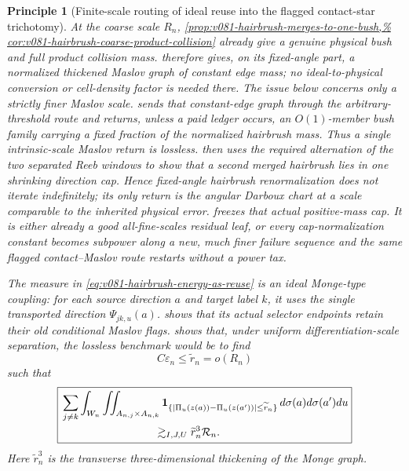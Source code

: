 \documentclass[10pt]{article}
\newtheorem{principle}[theorem]{Principle}
\begin{document}
\begin{principle}[Finite-scale routing of ideal reuse into the flagged contact-star trichotomy]
\label{pr:v081-hairbrush-reuse-routing}
At the coarse scale \(R_n\),
\cref{prop:v081-hairbrush-merges-to-one-bush,%
cor:v081-hairbrush-coarse-product-collision} already give a genuine physical bush and full product
collision mass.   therefore gives, on its
fixed-angle part, a normalized thickened Maslov graph of constant edge mass; no
ideal-to-physical conversion or cell-density factor is needed there.  The issue below concerns only
a strictly finer Maslov scale.
 sends that constant-edge graph
through the arbitrary-threshold route and returns, unless a paid ledger occurs, an \(O(1)\)-member
bush family carrying a fixed fraction of the normalized hairbrush mass.  Thus a single
intrinsic-scale Maslov return is lossless.   then uses the required alternation of the two
separated Reeb windows to show that a second merged hairbrush lies in one shrinking direction cap.
Hence fixed-angle hairbrush renormalization does not iterate indefinitely; its only return is the
angular Darboux chart at a scale comparable to the inherited physical error.
 freezes that actual positive-mass
cap.  It is either already a good all-fine-scales residual leaf, or every cap-normalization
constant becomes subpower along a new, much finer failure sequence and the same flagged
contact--Maslov route restarts without a power tax.

The measure in \eqref{eq:v081-hairbrush-energy-as-reuse} is an ideal Monge-type coupling: for each
source direction \(a\) and target label \(k\), it uses the single transported direction
\(\Psi_{jk,u}(a)\).   shows that its actual
selector endpoints retain their old conditional Maslov flags.   shows that, under uniform differentiation-scale
separation, the lossless benchmark would be to find
\[
C\varepsilon_n\le\widetilde r_n=o(R_n)
\]
such that
\begin{equation}
\label{eq:v081-hairbrush-coupling-to-product-target}
\boxed{
\begin{aligned}
&\sum_{j\ne k}\int_{W_n}
\iint_{A_{n,j}\times A_{n,k}}
\mathbf 1_{\{|\Pi_u(z(a))-\Pi_u(z(a'))|\le\widetilde r_n\}}
\,d\sigma(a)d\sigma(a')du\\
&\hspace{30mm}\gtrsim_{I,J,U}
\widetilde r_n^3\mathcal R_n.
\end{aligned}
}
\end{equation}
Here \(\widetilde r_n^3\) is the transverse three-dimensional thickening of the Monge graph.


\end{principle}
\end{document}

